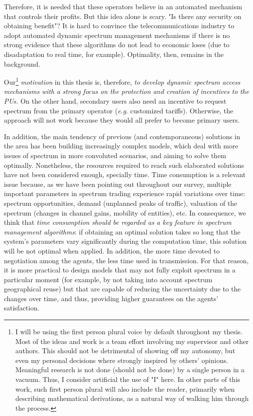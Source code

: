 Therefore, it is needed that these operators believe in an automated mechanism that controls their profits. But this idea alone is scary. "Is there any security on obtaining benefit"? It is hard to convince the telecommunications industry to adopt automated dynamic spectrum management mechanisms if there is no strong evidence that these algorithms do not lead to economic loses (due to disadaptation to real time, for example). Optimality, then, remains in the background.

Our\footnote{I will be using the first person plural voice by default throughout my thesis. Most of the ideas and work is a team effort involving my supervisor and other authors. This should not be detrimental of showing off my autonomy, but even my personal decisions where strongly inspired by others' opinions. Meaningful research is not done (should not be done) by a single person in a vacuum. Thus, I consider artificial the use of "I" here. In other parts of this work, such first person plural will also include the reader, primarily when describing mathematical derivations, as a natural way of walking him through the process.} \emph{motivation} in this thesis is, therefore, \emph{to develop dynamic spectrum access mechanisms with a strong focus on the protection and creation of incentives to the PUs.} 
On the other hand, secondary users also need an incentive to request spectrum from the primary operator (\textit{e.g.} customized tariffs). Otherwise, the approach will not work because they would all prefer to become primary users.

In addition, the main tendency of previous (and contemporaneous) solutions in the area has been building increasingly complex models, which deal with more issues of spectrum in more convoluted scenarios, and aiming to solve them optimally. 
Nonetheless, the resources required to reach such elaborated solutions have not been considered enough, specially time. Time consumption is a relevant issue because, as we have been pointing out throughout our survey, multiple important parameters in spectrum trading experience rapid variations over time: spectrum opportunities, demand (unplanned peaks of traffic), valuation of the spectrum (changes in channel gains, mobility of entities), etc.
In consequence, we think that \emph{time consumption should be regarded as a key feature in spectrum management algorithms}: if obtaining an optimal solution takes so long that the system’s parameters vary significantly during the computation time, this solution will be not optimal when applied. In addition, the more time devoted to negotiation among the agents, the less time used in transmission. For that reason, it is more practical to design models that may not fully exploit spectrum in a particular moment (for example, by not taking into account spectrum geographical reuse) but that are capable of reducing the uncertainty due to the changes over time, and thus, providing higher guarantees on the agents’ satisfaction. 

